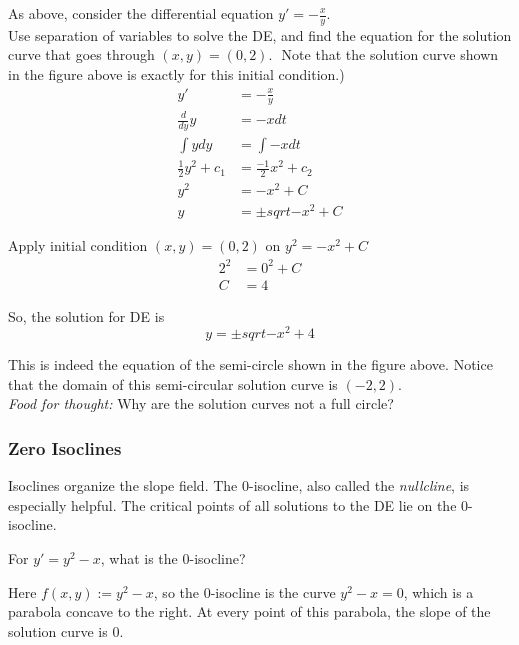As above, consider the differential equation $y' = - \frac{x}{y}$. \\
Use separation of variables to solve the DE,
and find the equation for the solution curve that goes through
$(x,y)=(0,2).\, \,$
Note that the solution curve shown in the figure above is exactly for this initial condition.) \\

\begin{align*}
  y' &= - \frac{x}{y} \\
  \frac{d}{dy} y  &=  -x dt\\
  \int y dy   &=  \int -x dt \\
  \frac{1}{2} y^2 + c_1 &= \frac{-1}{2} x^2 + c_2 \\
  y^2 &= -x^2 + C  \\
  y &= \pm sqrt{-x^2 + C}
\end{align*}

Apply initial condition $(x,y)=(0,2)$ on $y^2 = -x^2 + C\, $
\begin{align*}
  2^2 &= 0^2 + C \\
  C &= 4 
\end{align*}

So, the solution for DE is
\begin{equation*}
  y = \pm sqrt{-x^2 + 4}
\end{equation*}

This is indeed the equation of the semi-circle shown in the figure above.
Notice that the domain of this semi-circular solution curve is $(−2,2)$. \\
\emph{Food for thought:} Why are the solution curves not a full circle? 

\clearpage

\subsubsection{Zero Isoclines}

Isoclines organize the slope field.
The $0$-isocline, also called the \emph{\color{blue}nullcline}, is especially helpful.
The critical points of all solutions to the DE lie on the $0$-isocline.\\

\begin{example}
  For $y'=y^2-x$, what is the $0$-isocline?
\end{example}

\Solution Here $f(x, y):= y^2 - x$, so the $0$-isocline is the curve $y^2 - x = 0$,
which is a parabola concave to the right. At every point of this parabola,
the slope of the solution curve is $0$.

